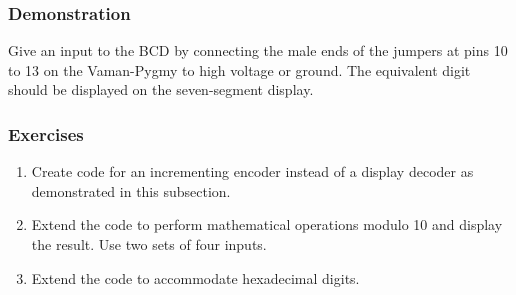 \subsubsection{Demonstration}
Give an input to the BCD by connecting the male ends of the jumpers at pins 10
to 13 on the Vaman-Pygmy to high voltage or ground. The equivalent digit should
be displayed on the seven-segment display.

\subsubsection{Exercises}
\begin{enumerate}
    \item Create code for an incrementing encoder instead of a display decoder
    as demonstrated in this subsection.
    \item Extend the code to perform mathematical operations modulo 10 and
    display the result. Use two sets of four inputs.
    \item Extend the code to accommodate hexadecimal digits.
\end{enumerate}